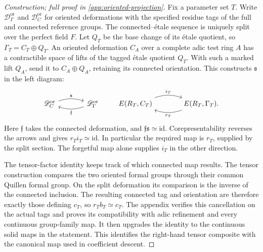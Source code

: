 \begin{proof}[Construction; full proof in \cref{app:oriented-projection}]
Fix a parameter set \(T\). Write \(\mathscr D_\Gamma^{\mathrm{or}}\)
and \(\mathscr D_C^{\mathrm{or}}\) for oriented deformations with the
specified residue tags of the full and connected reference groups.
The connected--\'{e}tale sequence is uniquely split over the perfect
field \(F\). Let \(Q_T\) be the base change of its \'{e}tale quotient,
so \(\Gamma_T=C_T\oplus Q_T\). An oriented deformation \(C_A\)
over a complete adic test ring \(A\) has a
contractible space of lifts of the tagged \'{e}tale quotient \(Q_T\).
With such a marked lift \(Q_A\), send it to
\(C_A\oplus Q_A\), retaining its connected orientation. This constructs
\(\mathfrak s\) in the left diagram:
\begin{equation}\label{eq:oriented-section-diagram}
\begin{tikzcd}[column sep=large]
 \mathscr D_C^{\mathrm{or}}
    \arrow[r,bend left=18,"\mathfrak s"]
 &\mathscr D_\Gamma^{\mathrm{or}}
    \arrow[l,bend left=18,"\mathfrak f"]
\end{tikzcd}
\qquad
\begin{tikzcd}[column sep=large]
 E(R_T,C_T)\arrow[r,bend left=18,"i_T"]
 &E(R_T,\Gamma_T)\arrow[l,bend left=18,"r_T"] .
\end{tikzcd}
\end{equation}
Here \(\mathfrak f\) takes the connected deformation, and
\(\mathfrak f\mathfrak s\simeq\mathrm{id}\). Corepresentability
reverses the arrows and gives \(r_Ti_T\simeq\mathrm{id}\).
In particular the required map is \(r_T\), supplied by the split
section. The forgetful map alone supplies \(i_T\) in the other direction.

The tensor-factor identity keeps track of which connected map results.
The tensor construction compares the two oriented formal groups through
their common Quillen formal group. On the split deformation its comparison
is the inverse of the connected inclusion. The resulting connected tag
and orientation are therefore exactly those defining \(c_T\), so
\(r_Tb_T\simeq c_T\). The appendix verifies this cancellation on the
actual tags and proves its compatibility with adic refinement and every
continuous group-family map. It then upgrades the identity to the
continuous solid maps in the statement. This identifies the right-hand
tensor composite with the canonical map used in coefficient descent.
\end{proof}

